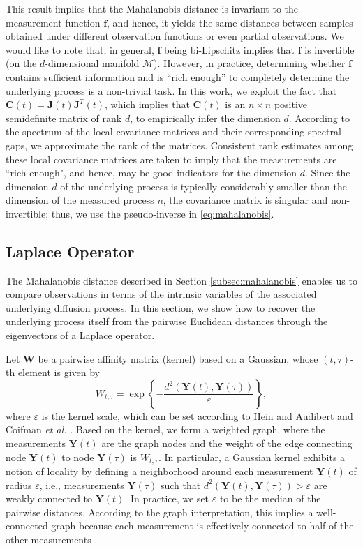 \documentclass[aip,jcp,preprint]{revtex4-1}
\begin{document}
%
This result implies that the Mahalanobis distance is invariant to the measurement function $\mathbf{f}$, and hence,
it yields the same distances between samples obtained under different observation functions or even partial observations.
%
We would like to note that, in general, $\mathbf{f}$ being bi-Lipschitz implies that $\mathbf{f}$ is invertible (on the $d$-dimensional
manifold $\mathcal{M}$).
%
However, in practice, determining whether $\mathbf{f}$ contains sufficient information and is ``rich enough'' to completely determine the underlying process is a non-trivial task.
%
In this work, we exploit the fact that $\mathbf{C}(t) = \mathbf{J}(t)\mathbf{J}^T(t)$, which implies that $\mathbf{C}(t)$ is an $n \times n$ positive semidefinite matrix of rank $d$, to empirically infer the dimension $d$.
%
According to the spectrum of the local covariance matrices and their corresponding spectral gaps, we approximate the rank of the matrices.
%
Consistent rank estimates among these local covariance matrices are taken to imply that the measurements are ``rich enough", and hence, may be good indicators for the dimension $d$.
%
Since the dimension $d$ of the underlying process is typically considerably smaller than the dimension of the measured process $n$,
the covariance matrix is singular and non-invertible;
%
thus, we use the pseudo-inverse in \eqref{eq:mahalanobis}.

\subsection{Laplace Operator}
The Mahalanobis distance described in Section \ref{subsec:mahalanobis} enables us to compare observations in terms of the intrinsic variables of the associated underlying diffusion process.
%
In this section, we show how to recover the underlying process itself from the pairwise Euclidean distances through the eigenvectors of a Laplace operator.

Let $\mathbf{W}$ be a pairwise affinity matrix (kernel) based on a Gaussian, whose $(t,\tau)$-th element is given by
\begin{equation}
	W_{t,\tau} = \exp \left\{ - \frac{ d^2(\mathbf{Y}(t), \mathbf{Y}(\tau) )} {\varepsilon}\right\},
	\label{eq:kernel}
\end{equation}
where $\varepsilon$ is the kernel scale, which can be set according to Hein and Audibert \cite{hein2005intrinsic} and Coifman {\em et al.} \cite{coifman2008graph}.
%
Based on the kernel, we form a weighted graph, where the measurements $\mathbf{Y}(t)$ are the graph nodes and the weight of the edge connecting node $\mathbf{Y}(t)$ to node $\mathbf{Y}(\tau)$ is $W_{t,\tau}$.
%
In particular, a Gaussian kernel exhibits a notion of locality by defining a neighborhood around each measurement $\mathbf{Y}(t)$ of radius $\varepsilon$,
i.e., measurements $\mathbf{Y}(\tau)$ such that $d^2(\mathbf{Y}(t), \mathbf{Y}(\tau) ) > \varepsilon$ are weakly connected to $\mathbf{Y}(t)$.
%
In practice, we set $\varepsilon$ to be the median of the pairwise distances.
%
According to the graph interpretation, this implies a well-connected graph because each measurement is effectively connected to half of the other measurements \cite{rohrdanz2011determination}.
\end{document}
